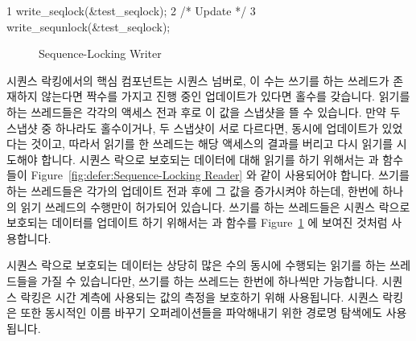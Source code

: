 { \scriptsize
\begin{verbbox}
  1 write_seqlock(&test_seqlock);
  2 /* Update */
  3 write_sequnlock(&test_seqlock);
\end{verbbox}
}
\begin{figure}[bp]
\centering
\theverbbox
\caption{Sequence-Locking Writer}
\label{fig:defer:Sequence-Locking Writer}
\end{figure}

시퀀스 락킹에서의 핵심 컴포넌트는 시퀀스 넘버로, 이 수는 쓰기를 하는 쓰레드가
존재하지 않는다면 짝수를 가지고 진행 중인 업데이트가 있다면 홀수를 갖습니다.
읽기를 하는 쓰레드들은 각각의 액세스 전과 후로 이 값을 스냅샷을 뜰 수 있습니다.
만약 두 스냅샷 중 하나라도 홀수이거나, 두 스냅샷이 서로 다르다면, 동시에
업데이트가 있었다는 것이고, 따라서 읽기를 한 쓰레드는 해당 액세스의 결과를
버리고 다시 읽기를 시도해야 합니다.
시퀀스 락으로 보호되는 데이터에 대해 읽기를 하기 위해서는 
과  함수들이 Figure~\ref{fig:defer:Sequence-Locking Reader}
와 같이 사용되어야 합니다.
쓰기를 하는 쓰레드들은 각가의 업데이트 전과 후에 그 값을 증가시켜야 하는데,
한번에 하나의 읽기 쓰레드의 수행만이 허가되어 있습니다.
쓰기를 하는 쓰레드들은 시퀀스 락으로 보호되는 데이터를 업데이트 하기 위해서는
 과  함수를
Figure~\ref{fig:defer:Sequence-Locking Writer} 에 보여진 것처럼 사용합니다.

시퀀스 락으로 보호되는 데이터는 상당히 많은 수의 동시에 수행되는 읽기를 하는
쓰레드들을 가질 수 있습니다만, 쓰기를 하는 쓰레드는 한번에 하나씩만 가능합니다.
시퀀스 락킹은 시간 계측에 사용되는 값의 측정을 보호하기 위해 사용됩니다.
시퀀스 락킹은 또한 동시적인 이름 바꾸기 오퍼레이션들을 파악해내기 위한 경로명
탐색에도 사용됩니다.
\iffalse

